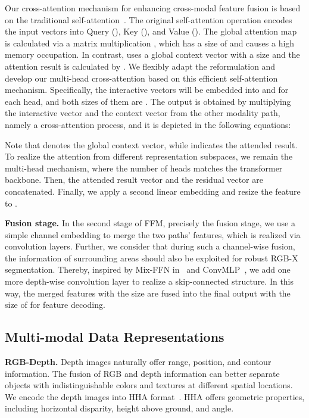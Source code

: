 \documentclass[journal]{IEEEtran}
\begin{document}
Our cross-attention mechanism for enhancing cross-modal feature fusion is based on the traditional self-attention~\cite{vaswani2017attention}.
The original self-attention operation encodes the input vectors into Query (), Key (), and Value (). The global attention map is calculated via a matrix multiplication , which has a size of  and causes a high memory occupation.
In contrast, \cite{shen2021efficient} uses a global context vector  with a size  and the attention result is calculated by .
We flexibly {adapt} the reformulation and develop our multi-head cross-attention based on this efficient self-attention mechanism.
Specifically, the interactive vectors will be embedded into  and  for each head, and both sizes of them are .
The output is obtained by multiplying the interactive vector and the context vector from the other modality path, namely a cross-attention process, and it is depicted in the following equations:


Note that  denotes the global context vector, while  indicates the attended result.
To realize the attention from different representation subspaces, we remain the multi-head mechanism, where the number of heads matches the transformer backbone.
Then, the attended result vector  and the residual vector  are concatenated.
Finally, we apply a second linear embedding and resize the feature to .

\noindent\textbf{Fusion stage.}
In the second stage of FFM, precisely the fusion stage, we use a simple channel embedding to merge the two paths' features, which is realized via  convolution layers.
Further, we consider that during such a channel-wise fusion, the information of surrounding areas should also be exploited for robust RGB-X segmentation. 
Thereby, inspired by Mix-FFN in~\cite{xie2021segformer} and ConvMLP~\cite{li2021convmlp}, we add one more depth-wise convolution layer  to realize a skip-connected structure.
In this way, the merged features with the size  are fused into the final output with the size of  for feature decoding.
 
\subsection{Multi-modal Data Representations}
\label{sec:multimodal_data_representations}

\noindent\textbf{RGB-Depth.}
Depth images naturally offer range, position, and contour information. {The fusion of RGB and depth information can better separate objects with indistinguishable colors and textures at different spatial locations. We encode the depth images into HHA format~\cite{gupta2014learning}.} HHA offers geometric properties, including horizontal disparity, height above ground, and angle. 
\end{document}
